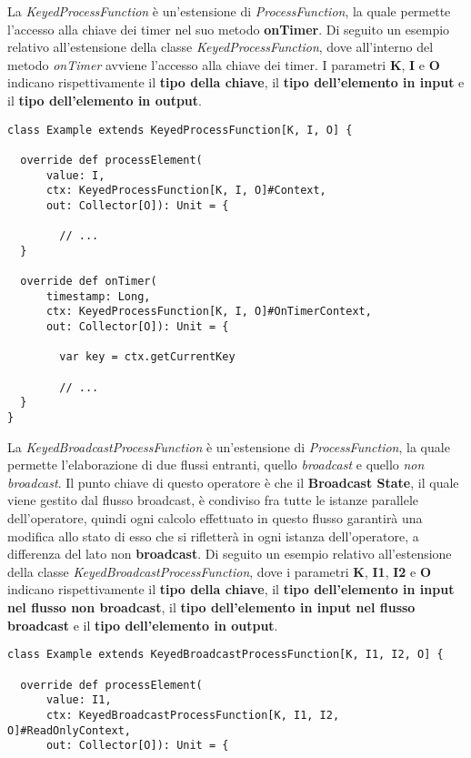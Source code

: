 {
La \textit{KeyedProcessFunction} è un'estensione di \textit{ProcessFunction}, la quale permette l'accesso alla chiave dei timer nel suo metodo \textbf{onTimer}. Di seguito un esempio relativo all'estensione della classe \textit{KeyedProcessFunction}, dove all'interno del metodo \textit{onTimer} avviene l'accesso alla chiave dei timer. I parametri \textbf{K}, \textbf{I} e \textbf{O} indicano rispettivamente il \textbf{tipo della chiave}, il \textbf{tipo dell'elemento in input} e il \textbf{tipo dell'elemento in output}.

\begin{verbatim}
class Example extends KeyedProcessFunction[K, I, O] {

  override def processElement(
      value: I, 
      ctx: KeyedProcessFunction[K, I, O]#Context, 
      out: Collector[O]): Unit = {
      
      	// ...
  }

  override def onTimer(
      timestamp: Long, 
      ctx: KeyedProcessFunction[K, I, O]#OnTimerContext, 
      out: Collector[O]): Unit = {
      
      	var key = ctx.getCurrentKey
      
      	// ...
  }
}
\end{verbatim}
La \textit{KeyedBroadcastProcessFunction} è un'estensione di \textit{ProcessFunction}, la quale permette l'elaborazione di due flussi entranti, quello \textit{broadcast} e quello \textit{non broadcast}. Il punto chiave di questo operatore è che il \textbf{Broadcast State}, il quale viene gestito dal flusso broadcast, è condiviso fra tutte le istanze parallele dell'operatore, quindi ogni calcolo effettuato in questo flusso garantirà una modifica allo stato di esso che si rifletterà in ogni istanza dell'operatore, a differenza del lato non \textbf{broadcast}. Di seguito un esempio relativo all'estensione della classe \textit{KeyedBroadcastProcessFunction}, dove i parametri \textbf{K}, \textbf{I1}, \textbf{I2} e \textbf{O} indicano rispettivamente il \textbf{tipo della chiave}, il \textbf{tipo dell'elemento in input nel flusso non broadcast}, il \textbf{tipo dell'elemento in input nel flusso broadcast} e il \textbf{tipo dell'elemento in output}.
\begin{verbatim}
class Example extends KeyedBroadcastProcessFunction[K, I1, I2, O] {

  override def processElement(
      value: I1, 
      ctx: KeyedBroadcastProcessFunction[K, I1, I2, O]#ReadOnlyContext, 
      out: Collector[O]): Unit = {
      

\end{verbatim}}
